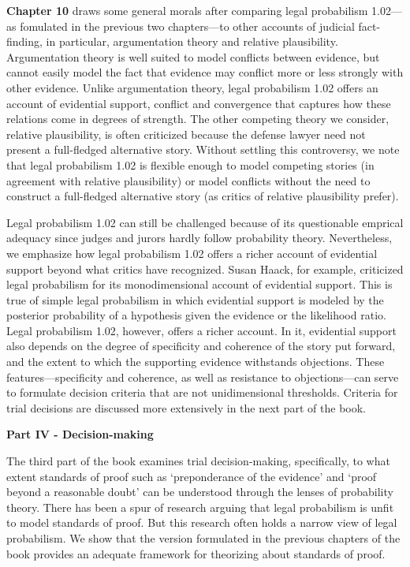 \documentclass[
  10pt,
  dvipsnames,enabledeprecatedfontcommands]{scrartcl}
\begin{document}
\textbf{Chapter 10} draws some general morals after comparing legal
probabilism 1.02---as fomulated in the previous two chapters---to other
accounts of judicial fact-finding, in particular, argumentation theory
and relative plausibility. Argumentation theory is well suited to model
conflicts between evidence, but cannot easily model the fact that
evidence may conflict more or less strongly with other evidence. Unlike
argumentation theory, legal probabilism 1.02 offers an account of
evidential support, conflict and convergence that captures how these
relations come in degrees of strength. The other competing theory we
consider, relative plausibility, is often criticized because the defense
lawyer need not present a full-fledged alternative story. Without
settling this controversy, we note that legal probabilism 1.02 is
flexible enough to model competing stories (in agreement with relative
plausibility) or model conflicts without the need to construct a
full-fledged alternative story (as critics of relative plausibility
prefer).

Legal probabilism 1.02 can still be challenged because of its
questionable emprical adequacy since judges and jurors hardly follow
probability theory. Nevertheless, we emphasize how legal probabilism
1.02 offers a richer account of evidential support beyond what critics
have recognized. Susan Haack, for example, criticized legal probabilism
for its monodimensional account of evidential support. This is true of
simple legal probabilism in which evidential support is modeled by the
posterior probability of a hypothesis given the evidence or the
likelihood ratio. Legal probabilism 1.02, however, offers a richer
account. In it, evidential support also depends on the degree of
specificity and coherence of the story put forward, and the extent to
which the supporting evidence withstands objections. These
features---specificity and coherence, as well as resistance to
objections---can serve to formulate decision criteria that are not
unidimensional thresholds. Criteria for trial decisions are discussed
more extensively in the next part of the book.

\vspace{3mm}

\noindent \textbf{Part IV - Decision-making}

\noindent The third part of the book examines trial decision-making,
specifically, to what extent standards of proof such as `preponderance
of the evidence' and `proof beyond a reasonable doubt' can be understood
through the lenses of probability theory. There has been a spur of
research arguing that legal probabilism is unfit to model standards of
proof. But this research often holds a narrow view of legal probabilism.
We show that the version formulated in the previous chapters of the book
provides an adequate framework for theorizing about standards of proof.
\end{document}
